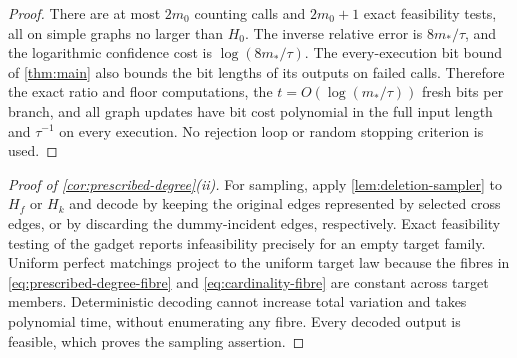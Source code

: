 \documentclass[11pt]{article}
\theoremstyle{definition}
\theoremstyle{remark}
\numberwithin{equation}{section}
\begin{document}
\begin{proof}
There are at most $2m_0$ counting calls and $2m_0+1$ exact feasibility
tests, all on simple graphs no larger than $H_0$. The inverse relative
error is $8m_*/\tau$, and the logarithmic confidence cost is
$\log(8m_*/\tau)$. The every-execution bit bound of \cref{thm:main} also
bounds the bit lengths of its outputs on failed calls. Therefore the
exact ratio and floor computations, the $t=O(\log(m_*/\tau))$ fresh bits per
branch, and all graph updates have bit cost polynomial in the full input
length and $\tau^{-1}$ on every execution. No rejection loop or
random stopping criterion is used.

\end{proof}

\begin{proof}[Proof of \cref{cor:prescribed-degree}\textup{(ii)}]
For sampling, apply \cref{lem:deletion-sampler} to $H_f$ or $H_k$ and
decode by keeping the original edges represented by selected cross edges,
or by discarding the dummy-incident edges, respectively. Exact feasibility
testing of the
gadget reports infeasibility precisely for an empty target family.
Uniform perfect matchings project to the uniform target law because the
fibres in \eqref{eq:prescribed-degree-fibre} and
\eqref{eq:cardinality-fibre} are constant across target members.
Deterministic decoding cannot increase total variation and takes polynomial
time, without enumerating any fibre. Every decoded output is feasible, which
proves the sampling assertion.
\end{proof}
\end{document}
